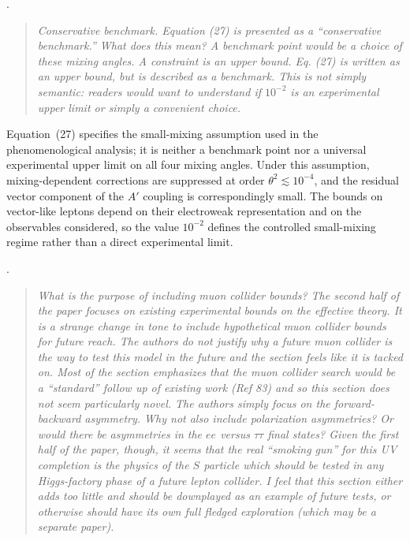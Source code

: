 \documentclass[12pt,a4paper]{article}
\begin{document}
\medskip
{}.
\begin{quote}\itshape
Conservative benchmark. Equation (27) is presented as a ``conservative benchmark.'' What does this mean? A benchmark point would be a choice of these mixing angles. A constraint is an upper bound. Eq. (27) is written as an upper bound, but is described as a benchmark. This is not simply semantic: readers would want to understand if \(10^{-2}\) is an experimental upper limit or simply a convenient choice.
\end{quote}

Equation~(27) specifies the small-mixing assumption used in the phenomenological analysis; it is neither a benchmark point nor a universal experimental upper limit on all four mixing angles. Under this assumption, mixing-dependent corrections are suppressed at order \(\theta^2\lesssim10^{-4}\), and the residual vector component of the \(A'\) coupling is correspondingly small. The bounds on vector-like leptons depend on their electroweak representation and on the observables considered, so the value \(10^{-2}\) defines the controlled small-mixing regime rather than a direct experimental limit.

\medskip
{}.
\begin{quote}\itshape
What is the purpose of including muon collider bounds? The second half of the paper focuses on existing experimental bounds on the effective theory. It is a strange change in tone to include hypothetical muon collider bounds for future reach. The authors do not justify why a future muon collider is the way to test this model in the future and the section feels like it is tacked on. Most of the section emphasizes that the muon collider search would be a ``standard'' follow up of existing work (Ref 83) and so this section does not seem particularly novel. The authors simply focus on the forward-backward asymmetry. Why not also include polarization asymmetries? Or would there be asymmetries in the \(ee\) versus \(\tau\tau\) final states? Given the first half of the paper, though, it seems that the real ``smoking gun'' for this UV completion is the physics of the \(S\) particle which should be tested in any Higgs-factory phase of a future lepton collider. I feel that this section either adds too little and should be downplayed as an example of future tests, or otherwise should have its own full fledged exploration (which may be a separate paper).
\end{quote}
\end{document}
